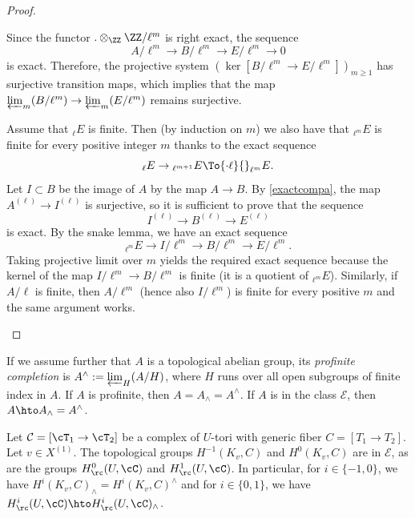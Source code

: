 \skpt
\begin{proof}
\begin{enumeratea}
\item
Since the functor $. \otimes_{\ZZ} \ZZ/\ell^m$ is right exact,
the sequence
\[
A/\ell^m \to B/\ell^m \to E/\ell^m \to 0
\]
is exact. Therefore, the projective system
$(\ker [B/\ell^m \to E/\ell^m])_{m \geq 1}$
has surjective transition maps, which
implies that the map $\varprojlim_m (B/\ell^m) \to \varprojlim_m (E/\ell^m)$
remains surjective.

\item
Assume that $_{\ell} E $ is finite. Then
(by induction on $m$) we also have that $_{\ell^m} E$ is finite
for every positive integer $m$ thanks to the exact sequence
\[
_{\ell} E \to{}_{\ell^{m+1}} E \To{\cdot\ell}{}_{\ell^m} E.
\]
Let $I \subset B$ be the image of $A$ by the map $A \to B$.
By \eqref{exactcompa}, the map $A^{(\ell)} \to I^{(\ell)}$ is surjective, so
it is sufficient to prove that the sequence
\[
I^{(\ell)} \to B^{(\ell)} \to E^{(\ell)}
\]
is exact. By the snake lemma, we have an exact sequence
\[
_{\ell^m} E \to I/\ell^m \to B/\ell^m \to E/\ell^m.
\]
Taking projective limit over $m$ yields the required exact sequence
because the kernel of the map $I/\ell^m \to B/\ell^m$ is finite
(it is a quotient of $_{\ell^m} E$). Similarly, if $A/\ell$ is finite,
then $A/\ell^m$ (hence also $I/\ell^m$) is finite for every positive
$m$ and the same argument works.\qedhere
\end{enumeratea}
\end{proof}

If we assume further that $A$ is a topological
abelian group, its \emph{profinite completion} is
$A^{\wedge}:=\varprojlim_H (A/H)$,
where $H$ runs over all open subgroups of finite index
in $A$. If $A$ is profinite, then $A=A_{\wedge}=A^{\wedge}$. If $A$ is in
the class $\mathcal E$, then $A \hto A_{\wedge}=A^{\wedge}$.

\begin{prop} \label{injectcompl}
Let $\mathcal C=[\cT_1 \to \cT_2]$ be a complex of $U$-tori with generic fiber
$C=[T_1 \to T_2]$. Let $v \in X^{(1)}$.
The topological groups $H^{-1}(K_v,C)$ and $H^0(K_v,C)$ are
in $\mathcal E$, as are
the groups $H^0_\rc(U,\cC)$ and $H^1_\rc(U,\cC)$. In particular, for
$i \in \{-1, 0\}$, we have $H^i(K_v,C)_{\wedge}=H^i(K_v,C)^{\wedge}$
and for $i \in \{0, 1\}$, we have $H^i_\rc(U,\cC) \hto
H^i_\rc(U,\cC)_{\wedge}$.
\end{prop}

